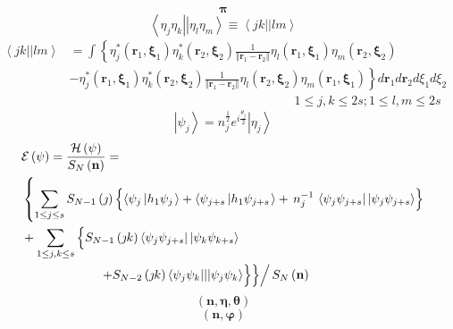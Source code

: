 \documentclass[aps,preprint]{revtex4}%
\begin{document}
\begin{equation}
\mathbf{\pi}%
\end{equation}%
\[
\left\langle \eta_{j}\eta_{k}\right\vert \left\vert \eta_{l}\eta
_{m}\right\rangle \equiv\left\langle jk||lm\right\rangle
\]%
\begin{align*}
\left\langle jk||lm\right\rangle  &  =\int\left\{  \eta_{j}^{\ast}\left(
\mathbf{r}_{1}\mathbf{,\xi}_{1}\right)  \eta_{k}^{\ast}\left(  \mathbf{r}%
_{2}\mathbf{,\xi}_{2}\right)  \frac{1}{\left\Vert \mathbf{r}_{1}%
-\mathbf{r}_{2}\right\Vert }\eta_{l}\left(  \mathbf{r}_{1}\mathbf{,\xi}%
_{1}\right)  \eta_{m}\left(  \mathbf{r}_{2}\mathbf{,\xi}_{2}\right)  \right.
\\
&  -\left.  \eta_{j}^{\ast}\left(  \mathbf{r}_{1}\mathbf{,\xi}_{1}\right)
\eta_{k}^{\ast}\left(  \mathbf{r}_{2}\mathbf{,\xi}_{2}\right)  \frac
{1}{\left\Vert \mathbf{r}_{1}-\mathbf{r}_{2}\right\Vert }\eta_{l}\left(
\mathbf{r}_{2}\mathbf{,\xi}_{2}\right)  \eta_{m}\left(  \mathbf{r}%
_{1}\mathbf{,\xi}_{1}\right)  \right\}  d\mathbf{r}_{1}d\mathbf{r}_{2}d\xi
_{1}d\xi_{2}\\
&  \left.  {}\right.  \qquad\qquad\qquad\qquad\qquad\qquad\qquad\qquad
\qquad1\leq j,k\leq2s;1\leq l,m\leq2s
\end{align*}%
\[
\left\vert \psi_{j}\right\rangle =n_{j}^{\frac{1}{2}}e^{i\frac{\theta_{j}}{2}%
}\left\vert \eta_{j}\right\rangle
\]%
\begin{align*}
&  \mathcal{E}\left(  \mathbf{\psi}\right)  =\frac{\mathcal{H}\left(
\mathbf{\psi}\right)  }{S_{N}\left(  \mathbf{n}\right)  }=\\
&  \left\{  \sum_{1\leq j\leq s}S_{N-1}\left(  \jmath\right)  \left\{
\overset{}{\left\langle \psi_{j}\left\vert h_{1}\psi_{j}\right.  \right\rangle
+\left\langle \psi_{j+s}\left\vert h_{1}\psi_{j+s}\right.  \right\rangle
}+\,n_{j}^{-1}\,\left\langle \psi_{j}\psi_{j+s}\right\vert \left\vert \psi
_{j}\psi_{j+s}\right\rangle \right\}  \right. \\
&  +\sum_{1\leq j,k\leq s}\left\{  \overset{}{S_{N-1}\left(  \jmath k\right)
\left\langle \psi_{j}\psi_{j+s}\right\vert \left\vert \psi_{k}\psi
_{k+s}\right\rangle }\right. \\
&  \qquad\qquad\qquad\left.  \left.  \left.  +\overset{}{S_{N-2}\left(  \jmath
k\right)  \left\langle \psi_{j}\psi_{k}|||\psi_{j}\psi_{k}\right\rangle
}\right\}  \right\}  \right/  S_{N}\left(  \mathbf{n}\right)
\end{align*}%
\[
\left(  \mathbf{n},\mathbf{\eta},\mathbf{\theta}\right)
\]%
\[
\left(  \mathbf{n},\mathbf{\varphi}\right)
\]%
\end{document}
